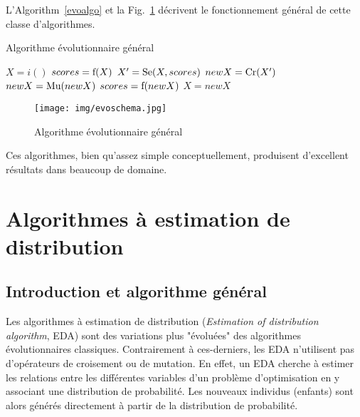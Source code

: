 \documentclass[a4paper, 11pt]{report}
\begin{document}
L'Algorithm~\ref{evoalgo} et la Fig.~\ref{evoschema} décrivent le fonctionnement général de cette classe d'algorithmes.

\begin{algorithm}                      
\caption{Algorithme évolutionnaire général~\cite{WIKI_EVO}}          
\label{evoalgo}                           
\begin{algorithmic}                    
\STATE $X = i()$ 
\STATE $scores = \textnormal{f}(X)$ 
\STATE $X' = \textnormal{Se}(X, scores)$ 
\STATE $newX = \textnormal{Cr}(X')$  
\STATE $newX = \textnormal{Mu}(newX)$ 
\STATE $scores = \textnormal{f}(newX)$ 
\STATE $X = newX$ 
\ENDWHILE
\end{algorithmic}
\end{algorithm}

\begin{figure}[!h]
\centering
\texttt{[image: img/evoschema.jpg]}	
\caption{Algorithme évolutionnaire général~\cite{WIKI_EVO}}
\label{evoschema}
\end{figure}

Ces algorithmes, bien qu'assez simple conceptuellement, produisent d'excellent résultats dans beaucoup de domaine.

\section{Algorithmes à estimation de distribution}
\label{edaintro}
\subsection{Introduction et algorithme général}
\label{edageneral}
Les algorithmes à estimation de distribution (\textit{Estimation of distribution algorithm}, EDA) sont des variations plus "évoluées" des algorithmes évolutionnaires classiques. Contrairement à ces-derniers, les EDA n'utilisent pas d'opérateurs de croisement ou de mutation. En effet, un EDA cherche à estimer les relations entre les différentes variables d'un problème d'optimisation en y associant une distribution de probabilité. Les nouveaux individus (enfants) sont alors générés directement à partir de la distribution de probabilité.
\end{document}
